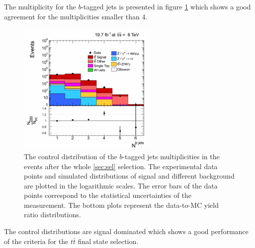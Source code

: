 The multiplicity for the $b$-tagged jets is presented in figure \ref{fig:CPbJetMult} which shows a good agreement for the multiplicities smaller than 4.

 \begin{figure}[h]
  \centering
  \includegraphics[width=0.6\textwidth]{04_event_reconstruction/plots/basic_bjet_multiplicity_step7.png}
  \caption{The control distribution of the $b$-tagged jets multiplicities in the events after the whole \ref{sec:sel} selection. 
  The experimental data points and simulated distributions of signal and different background are plotted in the logarithmic scales. 
  The error bars of the data points correspond to the statistical uncertainties of the measurement. 
  The bottom plots represent the data-to-MC yield ratio distributions.}
  \label{fig:CPbJetMult}
 \end{figure}
 
The control distributions are signal dominated which shows a good performance of the criteria for the $t\bar{t}$ final state selection.



